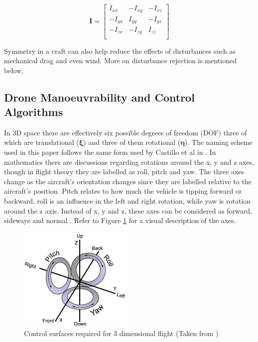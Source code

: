 \documentclass[a4paper, 10pt, conference]{ieeeconf}
\begin{document}
\begin{equation}
\label{EQ_InertiaTensor}
\textbf{I} = 
\begin{bmatrix}
I_{xx}	& -I_{xy} & -I_{xz}\\
-I_{yx}	& I_{yy}	& -I_{yz}\\
-I_{zx}	& -I_{zy}	& I_{zz}\\
\end{bmatrix}
\end{equation}

Symmetry in a craft can also help reduce the effects of disturbances such as mechanical drag and even wind. More on disturbance rejection is mentioned below.

\subsection{Drone Manoeuvrability and Control Algorithms}
In 3D space there are effectively six possible degrees of freedom (DOF) three of which are translational ($\boldsymbol{\xi}$) and three of them rotational ($\boldsymbol{\eta}$). The naming scheme used in this paper follows the same form used by Castillo et al in \cite{MiniFlying, RealTime}. In mathematics there are discussions regarding rotations around the x, y and z axes, though in flight theory they are labelled as roll, pitch and yaw. The three axes change as the aircraft's orientation changes since they are labelled relative to the aircraft's position. Pitch relates to how much the vehicle is tipping forward or backward, roll is an influence in the left and right rotation, while yaw is rotation around the z axis. Instead of  x, y and z, these axes can be considered as forward, sideways and normal \cite{Leishman}. Refer to Figure \ref{IM_PRY} for a visual description of the axes.

\begin{figure}[b]
	\centering
	\includegraphics[height = 5cm]{Images/Literature/RollPitchYaw}     
	\caption{Control surfaces required for 3 dimensional flight (Taken from \cite{Heli})}
	\label{IM_PRY}
\end{figure}
\end{document}
